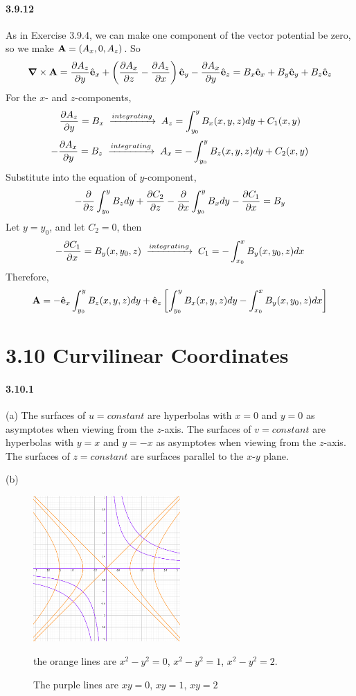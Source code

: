 \documentclass[a4paper]{article}
\begin{document}
\paragraph{3.9.12}
As in Exercise 3.9.4, we can make one component of the vector potential be zero, so we make $\mathbf{A}=(A_x,0,A_z)$. So
\[
\boldsymbol{\nabla}\times\mathbf{A}=\frac{\partial A_z}{\partial y}\hat{\mathbf{e}}_x+\left(\frac{\partial A_x}{\partial z}-\frac{\partial A_z}{\partial x} \right)\hat{\mathbf{e}}_y-\frac{\partial A_x}{\partial y}\hat{\mathbf{e}}_z=B_x\hat{\mathbf{e}}_x+B_y\hat{\mathbf{e}}_y+B_z\hat{\mathbf{e}}_z
\]
For the $x$- and $z$-components, 
\[
\frac{\partial A_z}{\partial y}=B_x\;\xrightarrow{integrating}\;A_z=\int_{y_0}^yB_x(x,y,z) dy+C_1(x,y)
\]
\[
-\frac{\partial A_x}{\partial y}=B_z\;\xrightarrow{integrating}\;A_x=-\int_{y_0}^yB_z(x,y,z) dy+C_2(x,y)
\]
Substitute into the equation of $y$-component, 
\[
-\frac{\partial}{\partial z}\int_{y_0}^yB_zdy+\frac{\partial C_2}{\partial z}-\frac{\partial}{\partial x}\int_{y_0}^yB_xdy-\frac{\partial C_1}{\partial x}=B_y
\]
Let $y=y_0$, and let $C_2=0$, then 
\[
-\frac{\partial C_1}{\partial x}=B_y(x,y_0,z)\;\xrightarrow{integrating}\;C_1=-\int_{x_0}^xB_y(x,y_0,z) dx
\]
Therefore, 
\[
\mathbf{A}=-\hat{\mathbf{e}}_x\int_{y_0}^yB_z(x,y,z) dy+\hat{\mathbf{e}}_z\left[\int_{y_0}^yB_x(x,y,z) dy-\int_{x_0}^xB_y(x,y_0,z) dx \right]
\]

\section*{3.10 Curvilinear Coordinates}

\paragraph{3.10.1}
(a) The surfaces of $u=constant$ are hyperbolas with $x=0$ and $y=0$ as asymptotes when viewing from the $z$-axis.  The surfaces of $v=constant$ are hyperbolas with $y=x$ and $y=-x$ as asymptotes when viewing from the $z$-axis. The surfaces of $z=constant$ are surfaces parallel to the $x$-$y$ plane.

(b) 

\begin{figure}[h]
    \centering
    \includegraphics[width=0.5\textwidth]{B.PNG}
    \caption{The purple lines are $xy=0$, $xy=1$, $xy=2$} the orange lines are $x^2-y^2=0$, $x^2-y^2=1$, $x^2-y^2=2$.
    \label{fig:B}
\end{figure}
\end{document}
